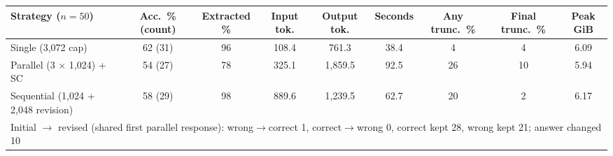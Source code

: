 \begin{tabular}{lcccccccc}
\toprule
Strategy ($n=50$) & Acc.\ \% (count) & Extracted \% & Input tok. & Output tok. & Seconds & Any trunc.\ \% & Final trunc.\ \% & Peak GiB \\
\midrule
Single (3,072 cap) & 62 (31) & 96 & 108.4 & 761.3 & 38.4 & 4 & 4 & 6.09 \\
Parallel (3 $\times$ 1,024) + SC & 54 (27) & 78 & 325.1 & 1,859.5 & 92.5 & 26 & 10 & 5.94 \\
Sequential (1,024 + 2,048 revision) & 58 (29) & 98 & 889.6 & 1,239.5 & 62.7 & 20 & 2 & 6.17 \\ \midrule
\multicolumn{9}{l}{Initial $\to$ revised (shared first parallel response): wrong$\to$correct 1, correct$\to$wrong 0, correct kept 28, wrong kept 21; answer changed 10} \\
\bottomrule
\end{tabular}